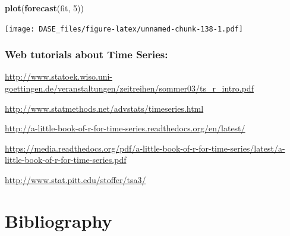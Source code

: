 \documentclass[]{book}
\newenvironment{Shaded}{\begin{snugshade}}{\end{snugshade}}
\newcommand{\KeywordTok}[1]{\textcolor[rgb]{0.13,0.29,0.53}{\textbf{{#1}}}}
\newcommand{\DecValTok}[1]{\textcolor[rgb]{0.00,0.00,0.81}{{#1}}}
\newcommand{\NormalTok}[1]{{#1}}
\begin{document}
\begin{Shaded}
\begin{Highlighting}[]
\KeywordTok{plot}\NormalTok{(}\KeywordTok{forecast}\NormalTok{(fit, }\DecValTok{5}\NormalTok{))}
\end{Highlighting}
\end{Shaded}

\texttt{[image: DASE\_files/figure-latex/unnamed-chunk-138-1.pdf]}

\section{Web tutorials about Time
Series:}\label{web-tutorials-about-time-series}

\url{http://www.statoek.wiso.uni-goettingen.de/veranstaltungen/zeitreihen/sommer03/ts_r_intro.pdf}

\url{http://www.statmethods.net/advstats/timeseries.html}

\url{http://a-little-book-of-r-for-time-series.readthedocs.org/en/latest/}

\url{https://media.readthedocs.org/pdf/a-little-book-of-r-for-time-series/latest/a-little-book-of-r-for-time-series.pdf}

\url{http://www.stat.pitt.edu/stoffer/tsa3/}

\part{Bibliography}\label{part-bibliography}


\end{document}
